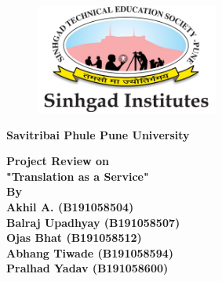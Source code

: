 
\begin{titlepage}
\enlargethispage{3cm}


\begin{center}

\begin{figure}[h]
  \begin{center}
  \includegraphics[height=36mm]{Images/Logos/Sinhgad.jpeg}
  \end{center}
\end{figure}

\vspace*{0.2cm}

\textbf{\Large Savitribai Phule Pune University}\\[10pt]

\vspace*{0.2cm}


 \bf Project Review on  \\
\textbf{ "Translation as a Service"} \\
\bf By  \\
\vspace{5mm}
Akhil A. (B191058504) \\
Balraj Upadhyay (B191058507) \\
Ojas Bhat (B191058512) \\
Abhang Tiwade (B191058594) \\
Pralhad Yadav (B191058600) \\




\end{center}
\end{titlepage}
